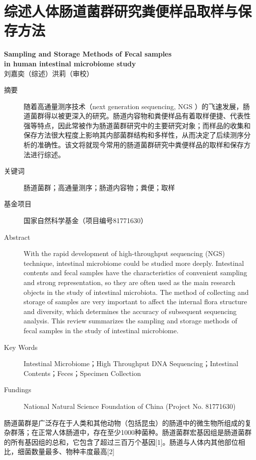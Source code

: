 \chapter{综述\quad 人体肠道菌群研究粪便样品取样与保存方法}
\begin{center} \textbf{Sampling and Storage Methods of Fecal samples \\ in human intestinal microbiome study}\\刘嘉奕（综述）\qquad 洪莉（审校）
\end{center}

\begin{description}
    \item[摘要] 随着高通量测序技术（next generation sequencing, NGS ）的飞速发展，肠道菌群得以被更深入的研究。肠道内容物和粪便样品有着取样便捷、代表性强等特点，因此常被作为肠道菌群研究中的主要研究对象；而样品的收集和保存方法很大程度上影响其内部菌群结构和多样性，从而决定了后续测序分析的准确性。该文将就现今常用的肠道菌群研究中粪便样品的取样和保存方法进行综述。
    \item[关键词] 肠道菌群；高通量测序；肠道内容物；粪便；取样
    \item[基金项目] 国家自然科学基金（项目编号81771630）
    \item[Abstract]With the rapid development of high-throughput sequencing (NGS) technique, intestinal microbiome could be studied more deeply. Intestinal contents and fecal samples have the characteristics of convenient sampling and strong representation, so they are often used as the main research objects in the study of intestinal microbiota. The method of collecting and storage of samples are very important to affect the internal flora structure and diversity, which determines the accuracy of subsequent sequencing analysis. This review summarizes the sampling and storage methods of fecal samples in the study of intestinal microbiome.
    \item[Key Words]Intestinal Microbiome；High Throughput DNA Sequencing；Intestinal Contents；Feces；Specimen Collection
    \item[Fundings]National Natural Science Foundation of China (Project No. 81771630)
\end{description}


肠道菌群是广泛存在于人类和其他动物（包括昆虫）的肠道中的微生物所组成的复杂群落；在正常人体肠道中，存在至少1000种菌种。肠道菌群宏基因组是肠道菌群的所有基因组的总和，它包含了超过三百万个基因[1]。肠道与人体内其他部位相比，细菌数量最多、物种丰度最高[2]

